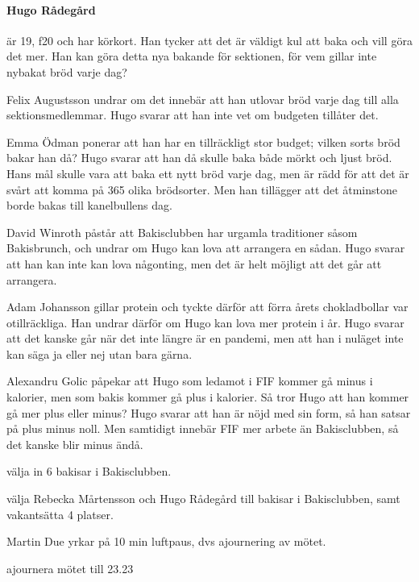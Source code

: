 \documentclass[hidelinks]{sektionsmote}
\begin{document}
\paragraph{Hugo Rådegård} är 19, f20 och har körkort.
Han tycker att det är väldigt kul att baka och vill göra det mer.
Han kan göra detta nya bakande för sektionen, för vem gillar inte nybakat bröd varje dag?

Felix Augustsson undrar om det innebär att han utlovar bröd varje dag till alla sektionsmedlemmar.
Hugo svarar att han inte vet om budgeten tillåter det.

Emma Ödman ponerar att han har en tillräckligt stor budget; vilken sorts bröd bakar han då?
Hugo svarar att han då skulle baka både mörkt och ljust bröd.
Hans mål skulle vara att baka ett nytt bröd varje dag, men är rädd för att det är svårt att komma på 365 olika brödsorter.
Men han tillägger att det åtminstone borde bakas till kanelbullens dag.

David Winroth påstår att Bakisclubben har urgamla traditioner såsom Bakisbrunch, och undrar om Hugo kan lova att arrangera en sådan.
Hugo svarar att han kan inte kan lova någonting, men det är helt möjligt att det går att arrangera.

Adam Johansson gillar protein och tyckte därför att förra årets chokladbollar var otillräckliga.
Han undrar därför om Hugo kan lova mer protein i år.
Hugo svarar att det kanske går när det inte längre är en pandemi, men att han i nuläget inte kan säga ja eller nej utan bara gärna.

Alexandru Golic påpekar att Hugo som ledamot i FIF kommer gå minus i kalorier, men som bakis kommer gå plus i kalorier.
Så tror Hugo att han kommer gå mer plus eller minus?
Hugo svarar att han är nöjd med sin form, så han satsar på plus minus noll.
Men samtidigt innebär FIF mer arbete än Bakisclubben, så det kanske blir minus ändå.

\begin{beslut}
  \item välja in 6 bakisar i Bakisclubben.
  \item välja Rebecka Mårtensson och Hugo Rådegård till bakisar i Bakisclubben, samt vakantsätta 4 platser.
\end{beslut}

\begin{ofraga}
  Martin Due yrkar på 10 min luftpaus, dvs ajournering av mötet.
  \begin{beslut}
    \item ajournera mötet till 23.23
  \end{beslut}
\end{ofraga}
\end{document}
